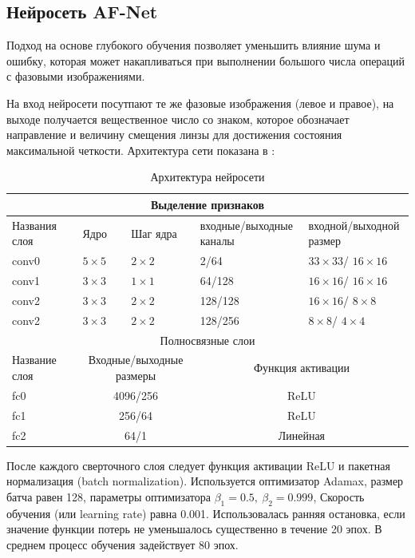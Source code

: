 \subsection{Нейросеть AF-Net}
Подход на основе глубокого обучения \cite{AF-Net} позволяет уменьшить влияние шума и ошибку, которая может накапливаться при выполнении большого числа операций с фазовыми изображениями.

На вход нейросети посутпают те же фазовые изображения (левое и правое), на выходе получается вещественное число со знаком, которое обозначает направление и величину смещения линзы для достижения состояния максимальной четкости. Архитектура сети показана в :

\begin{table}[!htbp]
	\centering
	\small
	\begin{tabular}{|p{2.5cm}<{\centering}|p{2.5cm}<{\centering}|p{2.5cm}<{\centering}|p{3.5cm}<{\centering}|p{3.5cm}<{\centering}|}
		\hline
		\multicolumn{5}{|c|}{Выделение признаков} \\ \hline
		Названия слоя & Ядро & Шаг ядра & входные/выходные каналы & входной/выходной размер\\ \hline
		conv0 & $5 \times 5$ & $2 \times 2$ & 2/64 & $33 \times 33$/ $16 \times 16$ \\ \hline
		conv1 & $3 \times 3$ & $1 \times 1$ & 64/128 & $16 \times 16$/ $16 \times 16$ \\ \hline
		conv2 & $3 \times 3$ & $2 \times 2$ & 128/128 & $16 \times 16$/ $8 \times 8$ \\ \hline
		conv2 & $3 \times 3$ & $2 \times 2$ & 128/256 & $8 \times 8$/ $4 \times 4$ \\ \hline
		\multicolumn{5}{|c|}{Полносвязные слои} \\ \hline
		Название слоя & \multicolumn{2}{c|}{Входные/выходные размеры} & \multicolumn{2}{c|}{Функция активации} \\ \hline
		fc0 & \multicolumn{2}{c|}{4096/256} & \multicolumn{2}{c|}{ReLU} \\ \hline
		fc1 & \multicolumn{2}{c|}{256/64} & \multicolumn{2}{c|}{ReLU} \\ \hline
		fc2 & \multicolumn{2}{c|}{64/1} & \multicolumn{2}{c|}{Линейная} \\ \hline
	\end{tabular}
	\caption{Архитектура нейросети}
	\label{tab:AFNet_struct}
\end{table}

После каждого сверточного слоя следует функция активации ReLU и пакетная нормализация (batch normalization). Используется оптимизатор Adamax, размер батча равен 128, параметры оптимизатора $\beta_1 = 0.5,\ \beta_2 = 0.999$, Скорость обучения (или learning rate) равна 0.001. Использовалась ранняя остановка, если значение функции потерь не уменьшалось существенно в течение 20 эпох. В среднем процесс обучения задействует 80 эпох.

